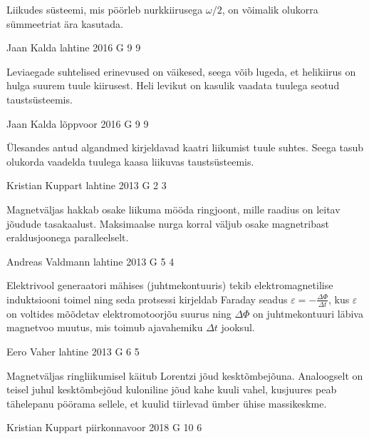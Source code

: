 \documentclass[11pt]{article}
\begin{document}
{{\ifHint
Liikudes süsteemi, mis pöörleb nurkkiirusega $\omega/2$, on võimalik olukorra sümmeetriat ära kasutada.
\fi
}

{Jaan Kalda} %
{lahtine} %
{2016} %
{G 9} %
{9} %
{

\ifHint
Leviaegade suhtelised erinevused on väikesed, seega võib lugeda, et helikiirus on hulga suurem tuule kiirusest. Heli levikut on kasulik vaadata tuulega seotud taustsüsteemis.
\fi
}

{Jaan Kalda} %
{lõppvoor} %
{2016} %
{G 9} %
{9} %
{

\ifHint
Ülesandes antud algandmed kirjeldavad kaatri liikumist tuule suhtes. Seega tasub olukorda vaadelda tuulega kaasa liikuvas taustsüsteemis.
\fi
}

{Kristian Kuppart} %
{lahtine} %
{2013} %
{G 2} %
{3} %
{

\ifHint
Magnetväljas hakkab osake liikuma mööda ringjoont, mille raadius on leitav jõudude tasakaalust. Maksimaalse nurga korral väljub osake magnetribast eraldusjoonega paralleelselt.
\fi
}

{Andreas Valdmann} %
{lahtine} %
{2013} %
{G 5} %
{4} %
{

\ifHint
Elektrivool generaatori mähises (juhtmekontuuris) tekib elektromagnetilise induktsiooni toimel ning seda protsessi kirjeldab Faraday seadus $\varepsilon = -\frac{\Delta\Phi}{\Delta t}$, kus $\varepsilon$ on voltides mõõdetav elektromotoorjõu suurus ning $\Delta\Phi$ on juhtmekontuuri läbiva magnetvoo muutus, mis toimub ajavahemiku $\Delta t$ jooksul.
\fi
}

{Eero Vaher} %
{lahtine} %
{2013} %
{G 6} %
{5} %
{

\ifHint
Magnetväljas ringliikumisel käitub Lorentzi jõud kesktõmbejõuna. Analoogselt on teisel juhul kesktõmbejõud kuloniline jõud kahe kuuli vahel, kusjuures peab tähelepanu pöörama sellele, et kuulid tiirlevad ümber ühise massikeskme.
\fi
}

{Kristian Kuppart} %
{piirkonnavoor} %
{2018} %
{G 10} %
{6} %
{

}}
\end{document}
